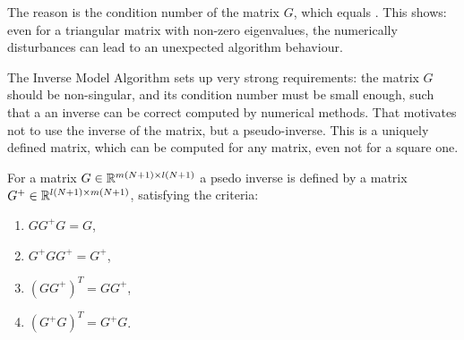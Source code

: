 \begin{exam}
	The reason is the condition number of the matrix $G$, which equals \badCondNb. This shows: even for a triangular matrix with non-zero eigenvalues, the numerically disturbances can lead to an unexpected algorithm behaviour. 
		
\end{exam}

The Inverse Model Algorithm sets up very strong requirements: the matrix $G$ should be non-singular, and its condition number must be small enough, such that a an inverse can be correct computed by numerical methods. 
That motivates not to use the inverse of the matrix, but a pseudo-inverse. This is a uniquely defined matrix, which can be computed for any matrix, even not for a square one.

\begin{defi}
	\label{def:ILC:pseudoinv}
	For a matrix $G \in {\mathbb{R}}^{m(N+1) \times l(N+1)}$ a psedo inverse is defined by a matrix $G^+ \in {\mathbb{R}}^{l(N+1) \times m(N+1)}$, satisfying the criteria: 
	\begin{enumerate}
		\item $G G^+ G  = G $,
		\item $G^+ G G^+ = G^+$,
		\item $(G G^+)^T = G G^+$,
		\item $(G^+ G)^T = G^+ G$.
	\end{enumerate}
\end{defi}


